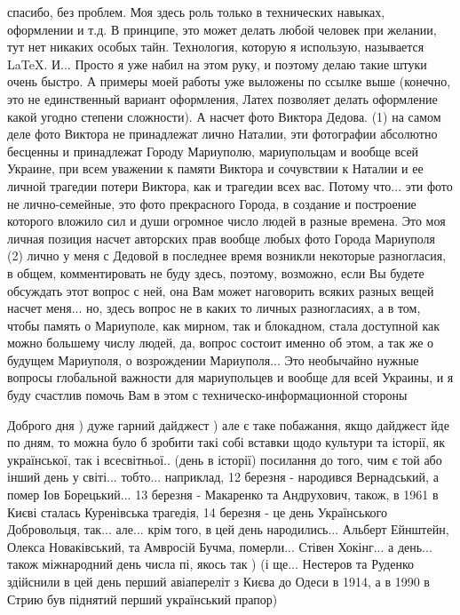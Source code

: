 спасибо, без проблем. Моя здесь роль только в технических навыках, оформлении и
т.д. В принципе, это может делать любой человек при желании, тут нет никаких
особых тайн. Технология, которую я использую, называется LaTeX. И... Просто я
уже набил на этом руку, и поэтому делаю такие штуки очень быстро. А примеры
моей работы уже выложены по ссылке выше (конечно, это не единственный вариант
оформления, Латех позволяет делать оформление какой угодно степени сложности).
А насчет фото Виктора Дедова. (1) на самом деле фото Виктора не принадлежат
лично Наталии, эти фотографии абсолютно бесценны и принадлежат Городу
Мариуполю, мариупольцам и вообще всей Украине, при всем уважении к памяти
Виктора и сочувствии к Наталии и ее личной трагедии потери Виктора, как и
трагедии всех вас. Потому что... эти фото не лично-семейные, это фото
прекрасного Города, в создание и построение которого вложило сил и души
огромное число людей в разные времена. Это моя личная позиция насчет авторских
прав вообще любых фото Города Мариуполя (2) лично у меня с Дедовой в последнее
время возникли некоторые разногласия, в общем, комментировать не буду здесь,
поэтому, возможно, если Вы будете обсуждать этот вопрос с ней, она Вам может
наговорить всяких разных вещей насчет меня... но, здесь вопрос не в каких то
личных разногласиях, а в том, чтобы память о Мариуполе, как мирном, так и
блокадном, стала доступной как можно большему числу людей, да, вопрос состоит
именно об этом, а так же о будущем Мариуполя, о возрождении Мариуполя... Это
необычайно нужные вопросы глобальной важности для мариупольцев и вообще для
всей Украины, и я буду счастлив помочь Вам в этом с техническо-информационной
стороны

Доброго дня ) дуже гарний дайджест ) але є таке побажання, якщо дайджест йде по
дням, то можна було б зробити такі собі вставки щодо культури та історії, як
української, так і всесвітньої.. (день в історії) посилання до того, чим є той
або інший день у світі... тобто... наприклад, 12 березня - народився
Вернадський, а помер Іов Борецький... 13 березня - Макаренко та Андрухович,
також, в 1961 в Києві сталась Куренівська трагедія, 14 березня - це день
Українського Добровольця, так... але... крім того, в цей день народились...
Альберт Ейнштейн, Олекса Новаківський, та Амвросій Бучма, померли... Стівен
Хокінг... а день... також міжнародний день числа пі, якось так ) (і ще...
Нестеров та Руденко здійснили в цей день перший авіапереліт з Києва до Одеси в
1914, а в 1990 в Стрию був піднятий перший український прапор)

